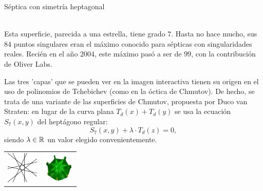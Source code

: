\documentclass[es]{../../common/SurferDesc}%
\begin{document}
\footnotesize




\begin{surferPage}
  \begin{surferTitle}Séptica con simetría heptagonal\end{surferTitle}   \\
    Esta superficie, parecida a una estrella, tiene grado $7$. 
    Hasta no hace mucho, sus $84$ puntos singulares eran el máximo conocido para sépticas
    con singularidades reales. Recién en el año $2004$, este máximo pasó a ser de $99$, 
    con la contribución de Oliver Labs.
    
    Las tres 'capas' que se pueden ver en la imagen interactiva tienen su origen
    en el uso de polinomios de Tchebichev (como en la óctica de Chmutov).  
    De hecho, se trata de una variante de las superficies de Chmutov, propuesta por Duco van Straten:
    en lugar de la curva plana $T_d(x)+T_d(y)$ se usa la ecuación
    $S_7(x,y)$ del heptágono regular: 
    \[S_7(x,y) + \lambda \cdot T_d(z) = 0,\]
    siendo $\lambda\in{\mathbb R}$ un valor elegido convenientemente.

  
    \vspace*{-0.3em}
    \begin{center}
      \begin{tabular}{c@{\qquad}c}
        \includegraphics[height=1.5cm]{../../common/images/labsseptic1.pdf}
        &
        \includegraphics[height=1.5cm]{../../common/images/septic_7eck_von_oben}
      \end{tabular}
    \end{center}
    \vspace*{-0.3em}   


  \begin{surferText}
     \end{surferText}
\end{surferPage}
\end{document}
